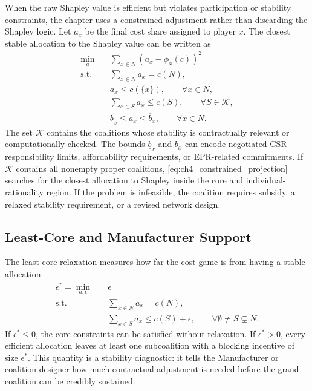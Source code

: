 When the raw Shapley value is efficient but violates participation or stability constraints, the chapter uses a constrained adjustment rather than discarding the Shapley logic. Let $a_x$ be the final cost share assigned to player $x$. The closest stable allocation to the Shapley value can be written as
\begin{equation}
\label{eq:ch4_constrained_projection}
\begin{aligned}
\min_{a}\quad
& \sum_{x\in N}\left(a_x-\phi_x(c)\right)^2\\
\text{s.t.}\quad
& \sum_{x\in N}a_x=c(N),\\
& a_x\leq c(\{x\}), \qquad \forall x\in N,\\
& \sum_{x\in S}a_x\leq c(S), \qquad \forall S\in\mathcal{K},\\
& \underline b_x\leq a_x\leq \overline b_x, \qquad \forall x\in N.
\end{aligned}
\end{equation}
The set $\mathcal{K}$ contains the coalitions whose stability is contractually relevant or computationally checked. The bounds $\underline b_x$ and $\overline b_x$ can encode negotiated CSR responsibility limits, affordability requirements, or EPR-related commitments. If $\mathcal{K}$ contains all nonempty proper coalitions, \eqref{eq:ch4_constrained_projection} searches for the closest allocation to Shapley inside the core and individual-rationality region. If the problem is infeasible, the coalition requires subsidy, a relaxed stability requirement, or a revised network design.

\subsection{Least-Core and Manufacturer Support}

The least-core relaxation measures how far the cost game is from having a stable allocation:
\begin{equation}
\label{eq:ch4_least_core}
\begin{aligned}
\epsilon^*=\min_{a,\epsilon}\quad & \epsilon\\
\text{s.t.}\quad
& \sum_{x\in N}a_x=c(N),\\
& \sum_{x\in S}a_x\leq c(S)+\epsilon,
\qquad \forall \emptyset\neq S\subsetneq N.
\end{aligned}
\end{equation}
If $\epsilon^*\leq 0$, the core constraints can be satisfied without relaxation. If $\epsilon^*>0$, every efficient allocation leaves at least one subcoalition with a blocking incentive of size $\epsilon^*$. This quantity is a stability diagnostic: it tells the Manufacturer or coalition designer how much contractual adjustment is needed before the grand coalition can be credibly sustained.

